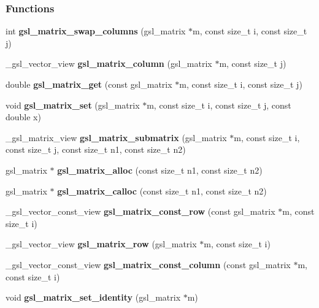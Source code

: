 \subsubsection*{Functions}
\begin{CompactItemize}
\item 
int {\bf gsl\_\-matrix\_\-swap\_\-columns} (gsl\_\-matrix $\ast$m, const size\_\-t i, const size\_\-t j)
\item 
\_\-gsl\_\-vector\_\-view {\bf gsl\_\-matrix\_\-column} (gsl\_\-matrix $\ast$m, const size\_\-t j)
\item 
double {\bf gsl\_\-matrix\_\-get} (const gsl\_\-matrix $\ast$m, const size\_\-t i, const size\_\-t j)
\item 
void {\bf gsl\_\-matrix\_\-set} (gsl\_\-matrix $\ast$m, const size\_\-t i, const size\_\-t j, const double x)
\item 
\_\-gsl\_\-matrix\_\-view {\bf gsl\_\-matrix\_\-submatrix} (gsl\_\-matrix $\ast$m, const size\_\-t i, const size\_\-t j, const size\_\-t n1, const size\_\-t n2)
\item 
gsl\_\-matrix $\ast$ \textbf{gsl\_\-matrix\_\-alloc} (const size\_\-t n1, const size\_\-t n2)\label{group__nr_g3c416b23f730c2e06cb5e9b257f1f571}

\item 
gsl\_\-matrix $\ast$ \textbf{gsl\_\-matrix\_\-calloc} (const size\_\-t n1, const size\_\-t n2)\label{group__nr_gf2e18583a2759c9d0f78b564f40eccd7}

\item 
\_\-gsl\_\-vector\_\-const\_\-view \textbf{gsl\_\-matrix\_\-const\_\-row} (const gsl\_\-matrix $\ast$m, const size\_\-t i)\label{group__nr_g1b0f557b9e570f397ab13dcc24e09e35}

\item 
\_\-gsl\_\-vector\_\-view \textbf{gsl\_\-matrix\_\-row} (gsl\_\-matrix $\ast$m, const size\_\-t i)\label{group__nr_gebf16339184d6759f4cdfa9c1724fb98}

\item 
\_\-gsl\_\-vector\_\-const\_\-view \textbf{gsl\_\-matrix\_\-const\_\-column} (const gsl\_\-matrix $\ast$m, const size\_\-t i)\label{group__nr_gf288953bef254a8e2221d778c28f7f97}

\item 
void \textbf{gsl\_\-matrix\_\-set\_\-identity} (gsl\_\-matrix $\ast$m)\label{group__nr_ge37f3f441742e70b1a701d92446e33fc}

\end{CompactItemize}
